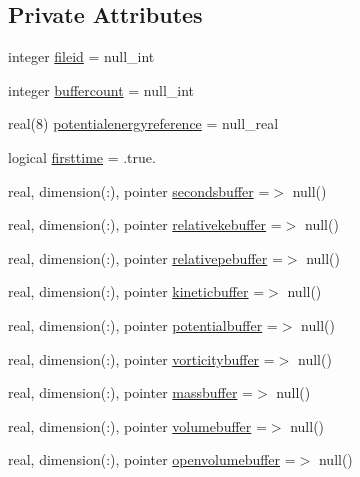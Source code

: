\subsection*{Private Attributes}
\begin{DoxyCompactItemize}
\item 
integer \mbox{\hyperlink{structmodulehydrodynamic_1_1t__energy_a1d130e84688cebf0fc131052141ef082}{fileid}} = null\+\_\+int
\item 
integer \mbox{\hyperlink{structmodulehydrodynamic_1_1t__energy_a8a5b50a7b3a5f4c91b54192e8314eeb5}{buffercount}} = null\+\_\+int
\item 
real(8) \mbox{\hyperlink{structmodulehydrodynamic_1_1t__energy_ae56e398128762975e3e7be6aee5e04a9}{potentialenergyreference}} = null\+\_\+real
\item 
logical \mbox{\hyperlink{structmodulehydrodynamic_1_1t__energy_a0755818642dcbfc9801f6e81e0015297}{firsttime}} = .true.
\item 
real, dimension(\+:), pointer \mbox{\hyperlink{structmodulehydrodynamic_1_1t__energy_a316c31ccc0f060051b7bcce4e4e12995}{secondsbuffer}} =$>$ null()
\item 
real, dimension(\+:), pointer \mbox{\hyperlink{structmodulehydrodynamic_1_1t__energy_a813e5930f2f8e5a672ca5b3a35927fbf}{relativekebuffer}} =$>$ null()
\item 
real, dimension(\+:), pointer \mbox{\hyperlink{structmodulehydrodynamic_1_1t__energy_a4a1f06a1abc90475abb224b95240d6a1}{relativepebuffer}} =$>$ null()
\item 
real, dimension(\+:), pointer \mbox{\hyperlink{structmodulehydrodynamic_1_1t__energy_a9cf6eaedece6aab2b5de5026badea2bc}{kineticbuffer}} =$>$ null()
\item 
real, dimension(\+:), pointer \mbox{\hyperlink{structmodulehydrodynamic_1_1t__energy_a062928a33df991e1d8a919caf249f036}{potentialbuffer}} =$>$ null()
\item 
real, dimension(\+:), pointer \mbox{\hyperlink{structmodulehydrodynamic_1_1t__energy_ab690e2b73d15c609b01e5271c7f3f10a}{vorticitybuffer}} =$>$ null()
\item 
real, dimension(\+:), pointer \mbox{\hyperlink{structmodulehydrodynamic_1_1t__energy_aec404a2ac413cf2db4da326c0e8c5246}{massbuffer}} =$>$ null()
\item 
real, dimension(\+:), pointer \mbox{\hyperlink{structmodulehydrodynamic_1_1t__energy_af5a6ed371f2d7472726c892bbfe804d0}{volumebuffer}} =$>$ null()
\item 
real, dimension(\+:), pointer \mbox{\hyperlink{structmodulehydrodynamic_1_1t__energy_aeb887efc5bd5b6456fc27032d539a908}{openvolumebuffer}} =$>$ null()

\end{DoxyCompactItemize}
